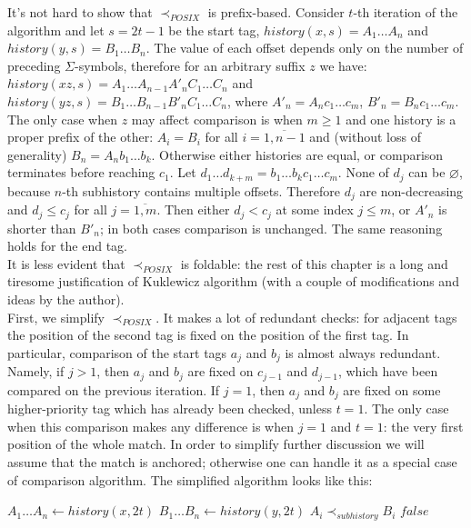 \documentclass{article}
\newcommand{\Xset}{\!\leftarrow\!}
\newcommand{\Xeq}{\!=\!}
\theoremstyle{definition}
\begin{document}
\begin{multicols}{2}
It's not hard to show that $\prec_{POSIX}$ is prefix-based.
Consider $t$-th iteration of the algorithm and let $s \Xeq 2t \!-\! 1$ be the start tag,
$history(x, s) \Xeq A_1 \dots A_n$ and $history(y, s) \Xeq B_1 \dots B_n$.
The value of each offset depends only on the number of preceding $\Sigma$-symbols,
therefore for an arbitrary suffix $z$ we have:
$history(xz, s) \Xeq A_1 \dots A_{n-1} A'_n C_1 \dots C_n$ and
$history(yz, s) \Xeq B_1 \dots B_{n-1} B'_n C_1 \dots C_n$,
where $A'_n \Xeq A_n c_1 \dots c_m$, $B'_n \Xeq B_n c_1 \dots c_m$.
The only case when $z$ may affect comparison is when $m \!\geq\! 1$ and one history is a proper prefix of the other:
$A_i \Xeq B_i$ for all $i \Xeq \overline{1,n-1}$ and (without loss of generality) $B_n \Xeq A_n b_1 \dots b_k$.
Otherwise either histories are equal, or comparison terminates before reaching $c_1$.
Let $d_1 \dots d_{k+m} \Xeq b_1 \dots b_k c_1 \dots c_m$.
None of $d_j$ can be $\varnothing$, because $n$-th subhistory contains multiple offsets.
Therefore $d_j$ are non-decreasing and $d_j \!\leq\! c_j$ for all $j \Xeq \overline{1, m}$.
Then either $d_j \!<\! c_j$ at some index $j \!\leq\! m$, or $A'_n$ is shorter than $B'_n$; in both cases comparison is unchanged.
The same reasoning holds for the end tag.
\\

It is less evident that $\prec_{POSIX}$ is foldable:
the rest of this chapter is a long and tiresome justification of Kuklewicz algorithm
(with a couple of modifications and ideas by the author).
\\

First, we simplify $\prec_{POSIX}$.
It makes a lot of redundant checks:
for adjacent tags the position of the second tag is fixed on the position of the first tag.
In particular, comparison of the start tags $a_j$ and $b_j$ is almost always redundant.
Namely, if $j \!>\! 1$, then $a_j$ and $b_j$ are fixed on $c_{j-1}$ and $d_{j-1}$, which have been compared on the previous iteration.
If $j \Xeq 1$, then $a_j$ and $b_j$ are fixed on some higher-priority tag which has already been checked, unless $t \Xeq 1$.
The only case when this comparison makes any difference is when $j \Xeq 1$ and $t \Xeq 1$:
the very first position of the whole match.
In order to simplify further discussion we will assume that the match is anchored;
otherwise one can handle it as a special case of comparison algorithm.
The simplified algorithm looks like this:
\\

    \begin{algorithm}[H] \DontPrintSemicolon {} 
     {
        \For {$t \Xeq \overline{1, N}$} {
            $A_1 \dots A_n \Xset history(x, 2t)$ \;
            $B_1 \dots B_n \Xset history(y, 2t)$ \;
            \For {$i \Xeq \overline{1, n}$} {
                 {\Return $A_i \prec_{subhistory} B_i$}
            }
        }
        \Return $false$ \;
    }
    \end{algorithm}



\end{multicols}
\end{document}
